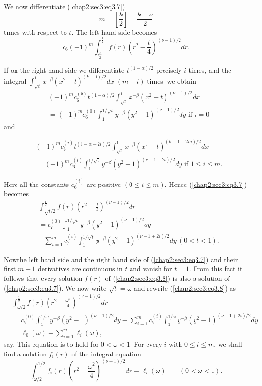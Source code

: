 We now differentiate (\ref{chap2:sec3:eq3.7})
$$
m = \left[\frac{k}{2}\right] = \frac{k- \nu}{2}
$$
times with respect to $t$. The left hand side becomes
$$
c_{6} (-1)^{m} \int_{\frac{\sqrt{t}}{2}}^{\frac{1}{2}} f(r) \left(r^{2} - \frac{t}{4}\right)^{(\nu - 1)/2} dr.
$$

If on the right hand side we differentiate $t^{(1-\alpha)/2}$ precisely $i$ times, and the integral $\int_{\sqrt{t}}^{1} x^{-\beta} (x^{2} - t)^{(k-1)/2} dx$ $(m-i)$ times, we obtain
\begin{align*}
& (-1)^{m} c_{6}^{(0)} t^{(1-\alpha)/2} \int_{\sqrt{t}}^{1} x^{-\beta} (x^{2} - t)^{(\nu - 1)/2} dx\\
& = (-1)^{m} c_{6}^{(0)} \int_{1}^{1/\sqrt{t}} y^{-\beta} (y^{2} - 1)^{(\nu - 1)/2} dy \text{ if } i = 0
\end{align*}
and

\begin{align*}
& (-1)^{m} c_{6}^{(i)} t^{(1-\alpha-2i)/2} \int_{\sqrt{t}}^{1} x^{-\beta} (x^{2} - t)^{(k-1-2m)/2} dx\\
& = (-1)^{m} c_{6}^{(i)} \int_{1}^{1/\sqrt{t}} y^{-\beta} (y^{2} - 1)^{(\nu-1+2i)/2} dy \text{ if } 1 \leq i \leq m.
\end{align*}

Here all the constants $c_{6}^{(i)}$ are positive $(0 \leq i \leq m)$. Hence (\ref{chap2:sec3:eq3.7}) becomes 
\begin{align*}
& \int_{\sqrt{t/2}}^{\frac{1}{2}} f(r) (r^{2} - \frac{t}{4})^{(\nu - 1)/2} dr\\
& = c_{7}^{(0)} \int_{1}^{1/\sqrt{t}} y^{-\beta} (y^{2} - 1)^{(\nu - 1)/2} dy\\ 
&  - \sum_{i=1}^{m}
c_{7}^{(i)} \int_{1}^{1/\sqrt{t}} y^{-\beta} (y^{2} - 1)^{(\nu-1+2i)/2} dy ~(0 < t < 1).\tag{3.8}\label{chap2:sec3:eq3.8}
\end{align*}

Now\pageoriginale the left hand side and the right hand side of (\ref{chap2:sec3:eq3.7}) and their first $m-1$ derivatives are continuous in $t$ and vanish for $t=1$. From this fact it follows that every solution $f(r)$ of (\ref{chap2:sec3:eq3.8}) is also a solution of (\ref{chap2:sec3:eq3.7}). We now write $\sqrt{t} = \omega$ and rewrite (\ref{chap2:sec3:eq3.8}) as
\begin{align*}
& \int_{\omega/2}^{\frac{1}{2}} f(r) (r^{2} - \frac{\omega^{2}}{4})^{(\nu-1)/2} dr\\
& = c_{7}^{(0)} \int_{1}^{1/\omega} y^{-\beta} (y^{2} - 1)^{(\nu-1)/2} dy - \sum_{i=1}^{m} c_{7}^{(i)} \int_{1}^{1/\omega} y^{-\beta} (y^{2} - 1)^{(\nu-1+2i)/2} dy\\
& = \ell_{0}(\omega) - \sum_{i=1}^{m} \ell_{i} (\omega),\tag{3.9}\label{chap2:sec3:eq3.9}
\end{align*}
say. This equation is to hold for $0<\omega<1$. For every $i$ with $0 \leq i \leq m$, we shall find a solution $f_{i}(r)$ of the integral equation
\begin{equation*}
\int_{\omega/2}^{1/2} f_{i}(r) (r^{2} - \frac{\omega^{2}}{4})^{(\nu-1)/2} dr = \ell_{i} (\omega) \qquad (0<\omega<1).\tag{3.10}\label{chap2:sec3:eq3.10}
\end{equation*}

